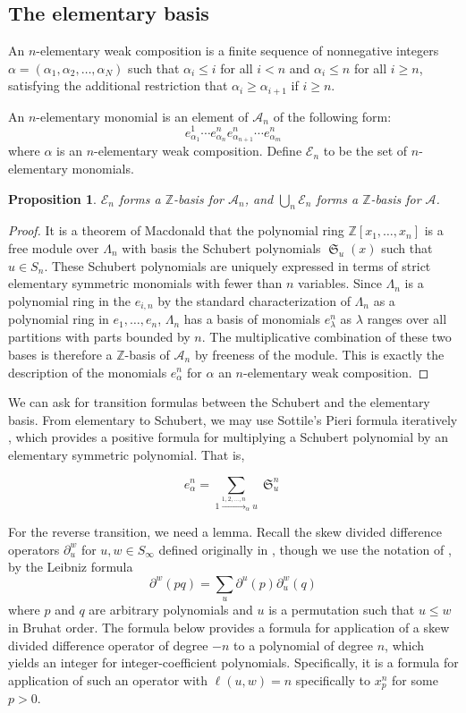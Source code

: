 \documentclass[a4paper,fleqn]{cas-sc}
\newtheorem{proposition}[lemma]{Proposition}
\theoremstyle{definition}
\theoremstyle{remark}
\numberwithin{equation}{subsection}
\DeclareMathOperator{\sch}{\mathfrak{S}}
\newcommand{\coma}{\mathcal{A}}
\begin{document}
\subsection{The elementary basis}

An $n$-elementary weak composition is a finite sequence of nonnegative integers $\alpha=(\alpha_1,\alpha_2,\ldots,\alpha_N)$ such that $\alpha_i\leq i$ for all $i<n$ and $\alpha_i\leq n$  for all $i\geq n$, satisfying the additional restriction that $\alpha_i\geq \alpha_{i+1}$ if $i\geq n$.

An $n$-elementary monomial is an element of $\coma_n$ of the following form: 
$$e_{\alpha_1}^{1}\cdots e_{\alpha_n}^ne_{\alpha_{n+1}}^n\cdots e_{\alpha_m}^n$$
where $\alpha$ is an $n$-elementary weak composition. Define $\mathcal{E}_n$ to be the set of $n$-elementary monomials.

\begin{proposition}
	$\mathcal{E}_n$ forms a $\mathbb{Z}$-basis for $\coma_n$, and $\bigcup_{n}\mathcal{E}_n$ forms a $\mathbb{Z}$-basis for $\coma$.
\end{proposition}
\begin{proof}
	It is a theorem of Macdonald that the polynomial ring $\mathbb{Z}[x_1,\ldots,x_n]$ is a free module over $\Lambda_n$ with basis the Schubert polynomials $\sch_u(x)$ such that $u\in S_n$. These Schubert polynomials are uniquely expressed in terms of strict elementary symmetric monomials with fewer than $n$ variables. Since $\Lambda_n$ is a polynomial ring in the $e_{i,n}$ by the standard characterization of $\Lambda_n$ as a polynomial ring in $e_1,\ldots,e_n$, $\Lambda_n$ has a basis of monomials $e_{\lambda}^n$ as $\lambda$ ranges over all partitions with parts bounded by $n$. The multiplicative combination of these two bases is therefore a $\mathbb{Z}$-basis of $\coma_n$ by freeness of the module. This is exactly the description of the monomials $e_{\alpha}^n$ for $\alpha$ an $n$-elementary weak composition.
\end{proof}

We can ask for transition formulas between the Schubert and the elementary basis. From elementary to Schubert, we may use Sottile's Pieri formula iteratively \cite{sottile}, which provides a positive formula for multiplying a Schubert polynomial by an elementary symmetric polynomial. That is,

$$e_{\alpha}^n = \sum_{1\xrightarrow{1,2,\ldots,n}_{\alpha} u}\sch_u^n$$

For the reverse transition, we need a lemma. Recall the skew divided difference operators $\partial_u^w$ for $u,w\in S_\infty$ defined originally in \cite{notes}, though we use the notation of \cite{samuelleibniz}, by the Leibniz formula
$$\partial^w(pq) = \sum_{u} \partial^u(p)\partial_u^w(q)$$
where $p$ and $q$ are arbitrary polynomials and $u$ is a permutation such that $u\leq w$ in Bruhat order. The formula below provides a formula for application of a skew divided difference operator of degree $-n$ to a polynomial of degree $n$, which yields an integer for integer-coefficient polynomials. Specifically, it is a formula for application of such an operator with $\ell(u,w)=n$ specifically to $x_p^n$ for some $p>0$.
\end{document}
